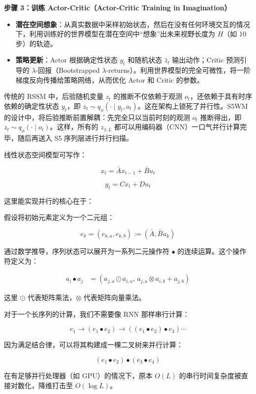 \textbf{步骤 3：训练 Actor-Critic（Actor-Critic Training in Imagination）}

\begin{itemize}
\tightlist
\item
  \textbf{潜在空间想象}：从真实数据中采样初始状态，然后在没有任何环境交互的情况下，利用训练好的世界模型在潜在空间中``想象''出未来视野长度为 \(H\)（如 10 步）的轨迹。
\item
  \textbf{策略更新}：Actor 根据确定性状态 \(y_t\) 和随机状态 \(\hat{z}_t\) 输出动作；Critic 预测引导的 \(\lambda\)-回报（Bootstrapped \(\lambda\)-returns）。利用世界模型的完全可微性，将一阶梯度反向传播给策略网络，从而优化 Actor 和 Critic 的参数。
\end{itemize}

传统的 RSSM 中，后验随机变量 \(z_t\) 的推断不仅依赖于观测 \(o_t\)，还依赖于具有时序依赖的确定性状态 \(y_t\)，即 \(z_t \sim q_{\phi}(\cdot \mid y_t, o_t)\)。这在架构上锁死了并行性。S5WM 的设计中，将后验推断前置解耦：先完全只以当前时刻的观测 \(o_t\) 推断得出，即 \(z_t \sim q_{\phi}(\cdot \mid o_t)\)。这样，所有的 \(z_{1:L}\) 都可以用编码器（CNN）一口气并行计算完毕，随后再送入 S5 序列层进行并行扫描。

线性状态空间模型可写作：

\[
x_t = \bar{A}x_{t-1} + \bar{B}u_t
\]

\[
y_t = Cx_t + Du_t
\]

这里能实现并行的核心在于：

假设将初始元素定义为一个二元组：

\[
e_k = (e_{k,a}, e_{k,b}) := (\bar{A}, \bar{B}u_k)
\]

通过数学推导，序列状态可以展开为一系列二元操作符 \(\bullet\) 的连续运算。这个操作符定义为：

\[
\begin{aligned}
a_i \bullet a_j
&=
\left(
a_{j,a} \odot a_{i,a},\,
a_{j,a} \otimes a_{i,b} + a_{j,b}
\right)
\end{aligned}
\]

这里 \(\odot\) 代表矩阵乘法，\(\otimes\) 代表矩阵向量乘法。

对于一个长序列的计算，我们不需要像 RNN 那样串行计算：

\[
e_1 \rightarrow (e_1 \bullet e_2) \rightarrow ((e_1 \bullet e_2) \bullet e_3) \cdots
\]

因为满足结合律，可以将其构建成一棵二叉树来并行计算：

\[
(e_1 \bullet e_2) \bullet (e_3 \bullet e_4)
\]

在有足够并行处理器（如 GPU）的情况下，原本 \(O(L)\) 的串行时间复杂度被直接对数化，降维打击至 \(O(\log L)\)。

